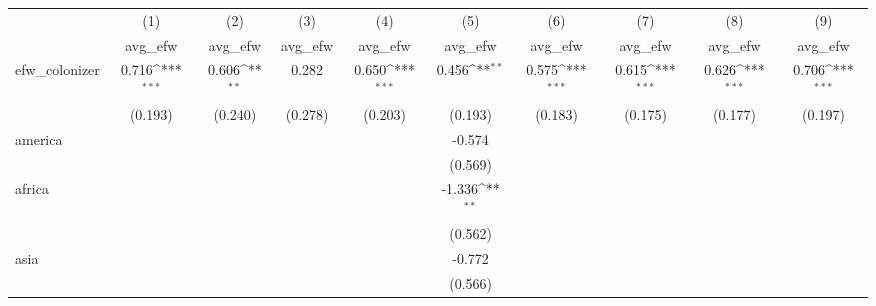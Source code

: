 {
\def\sym#1{\ifmmode^{#1}\else\(^{#1}\)\fi}
\begin{tabular}{l*{9}{c}}
\hline\hline
            &\multicolumn{1}{c}{(1)}&\multicolumn{1}{c}{(2)}&\multicolumn{1}{c}{(3)}&\multicolumn{1}{c}{(4)}&\multicolumn{1}{c}{(5)}&\multicolumn{1}{c}{(6)}&\multicolumn{1}{c}{(7)}&\multicolumn{1}{c}{(8)}&\multicolumn{1}{c}{(9)}\\
            &\multicolumn{1}{c}{avg\_efw}&\multicolumn{1}{c}{avg\_efw}&\multicolumn{1}{c}{avg\_efw}&\multicolumn{1}{c}{avg\_efw}&\multicolumn{1}{c}{avg\_efw}&\multicolumn{1}{c}{avg\_efw}&\multicolumn{1}{c}{avg\_efw}&\multicolumn{1}{c}{avg\_efw}&\multicolumn{1}{c}{avg\_efw}\\
\hline
efw\_colonizer&       0.716\sym{***}&       0.606\sym{**} &       0.282         &       0.650\sym{***}&       0.456\sym{**} &       0.575\sym{***}&       0.615\sym{***}&       0.626\sym{***}&       0.706\sym{***}\\
            &     (0.193)         &     (0.240)         &     (0.278)         &     (0.203)         &     (0.193)         &     (0.183)         &     (0.175)         &     (0.177)         &     (0.197)         \\
[1em]
america     &                     &                     &                     &                     &      -0.574         &                     &                     &                     &                     \\
            &                     &                     &                     &                     &     (0.569)         &                     &                     &                     &                     \\
[1em]
africa      &                     &                     &                     &                     &      -1.336\sym{**} &                     &                     &                     &                     \\
            &                     &                     &                     &                     &     (0.562)         &                     &                     &                     &                     \\
[1em]
asia        &                     &                     &                     &                     &      -0.772         &                     &                     &                     &                     \\
            &                     &                     &                     &                     &     (0.566)         &                     &                     &                     &                     \\

\end{tabular}}
